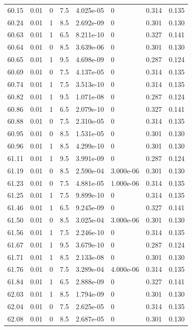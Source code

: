 \documentclass[preview]{standalone}
\begin{document}
{{{{{{{{{{{{{{{{{{\begin{tabular}{L{1.2cm}C{1.2cm} C{0.3cm}C{0.5cm} C{1.4cm}C{1.4cm} C{1.4cm}C{1.4cm}}
  60.15  &  0.01  & 0     & 7.5 &  4.025e-05  & 0  & 0.314 &  0.135   \\ 
  60.24  &  0.01  & 1     & 8.5 &  2.692e-09  & 0  & 0.301 &  0.130   \\ 
  60.63  &  0.01  & 1     & 6.5 &  8.211e-10  & 0  & 0.327 &  0.141   \\ 
  60.64  &  0.01  & 0     & 8.5 &  3.639e-06  & 0  & 0.301 &  0.130   \\ 
  60.65  &  0.01  & 1     & 9.5 &  4.698e-09  & 0  & 0.287 &  0.124   \\ 
  60.69  &  0.01  & 0     & 7.5 &  4.137e-05  & 0  & 0.314 &  0.135   \\ 
  60.74  &  0.01  & 1     & 7.5 &  3.513e-10  & 0  & 0.314 &  0.135   \\ 
  60.82  &  0.01  & 1     & 9.5 &  1.071e-08  & 0  & 0.287 &  0.124   \\ 
  60.86  &  0.01  & 1     & 6.5 &  2.079e-10  & 0  & 0.327 &  0.141   \\ 
  60.88  &  0.01  & 0     & 7.5 &  2.310e-05  & 0  & 0.314 &  0.135   \\ 
  60.95  &  0.01  & 0     & 8.5 &  1.531e-05  & 0  & 0.301 &  0.130   \\ 
  60.96  &  0.01  & 1     & 8.5 &  4.299e-10  & 0  & 0.301 &  0.130   \\ 
  61.11  &  0.01  & 1     & 9.5 &  3.991e-09  & 0  & 0.287 &  0.124   \\ 
  61.19  &  0.01  & 0     & 8.5 &  2.590e-04  & 3.000e-06  & 0.301 &  0.130   \\ 
  61.23  &  0.01  & 0     & 7.5 &  4.881e-05  & 1.000e-06  & 0.314 &  0.135   \\ 
  61.25  &  0.01  & 1     & 7.5 &  9.899e-10  & 0  & 0.314 &  0.135   \\ 
  61.46  &  0.01  & 1     & 6.5 &  9.245e-09  & 0  & 0.327 &  0.141   \\ 
  61.50  &  0.01  & 0     & 8.5 &  3.025e-04  & 3.000e-06  & 0.301 &  0.130   \\ 
  61.56  &  0.01  & 1     & 7.5 &  2.246e-10  & 0  & 0.314 &  0.135   \\ 
  61.67  &  0.01  & 1     & 9.5 &  3.679e-10  & 0  & 0.287 &  0.124   \\ 
  61.71  &  0.01  & 1     & 8.5 &  2.133e-08  & 0  & 0.301 &  0.130   \\ 
  61.76  &  0.01  & 0     & 7.5 &  3.289e-04  & 4.000e-06  & 0.314 &  0.135   \\ 
  61.84  &  0.01  & 1     & 6.5 &  2.888e-09  & 0  & 0.327 &  0.141   \\ 
  62.03  &  0.01  & 1     & 8.5 &  1.794e-09  & 0  & 0.301 &  0.130   \\ 
  62.04  &  0.01  & 0     & 7.5 &  2.625e-05  & 0  & 0.314 &  0.135   \\ 
  62.08  &  0.01  & 0     & 8.5 &  2.687e-05  & 0  & 0.301 &  0.130   \\ 
\hline 
\end{tabular} 

}}}}}}}}}}}}}}}}}}
\end{document}
